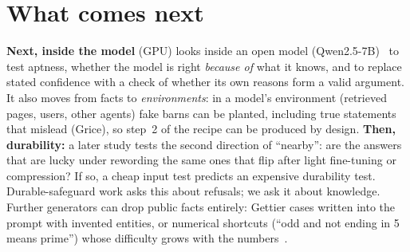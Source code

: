 \documentclass[10pt]{article}
\begin{document}
\section{What comes next}
\textbf{Next, inside the model} (GPU) looks inside an open model (Qwen2.5-7B)~\cite{marks,burns} to test aptness, whether the model is right \emph{because of} what it knows, and to replace stated confidence with a check of whether its own reasons form a valid argument. It also moves from facts to \emph{environments}: in a model's environment (retrieved pages, users, other agents) fake barns can be planted, including true statements that mislead (Grice), so step~2 of the recipe can be produced by design. \textbf{Then, durability:} a later study tests the second direction of ``nearby'': are the answers that are lucky under rewording the same ones that flip after light fine-tuning or compression? If so, a cheap input test predicts an expensive durability test. Durable-safeguard work asks this about refusals; we ask it about knowledge. Further generators can drop public facts entirely: Gettier cases written into the prompt with invented entities, or numerical shortcuts (``odd and not ending in 5 means prime'') whose difficulty grows with the numbers~\cite{gsmsym,dyval,livebench}.
\end{document}
